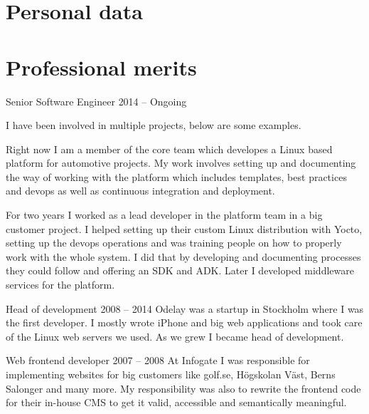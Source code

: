 \documentclass{twocolcv}
\begin{document}
\section*{Personal data}
\section*{Professional merits}
           {Senior Software Engineer}
           {2014 -- Ongoing}
           {
             {I have been involved in multiple projects, below are some examples.\newline}
             
        {Right now I am a member of the core team which developes a Linux based platform for automotive projects. My work involves setting up and documenting the way of working with the platform which includes templates, best practices and devops as well as continuous integration and deployment.\newline}
        
        {For two years I worked as a lead developer in the platform team in a big customer project. I helped setting up their custom Linux distribution with Yocto, setting up the devops operations and was training people on how to properly work with the whole system. I did that by developing and documenting processes they could follow and offering an SDK and ADK. Later I developed middleware services for the platform.}
}

     {Head of development}
     {2008 -- 2014}
     {Odelay was a startup in Stockholm where I was the first developer. I mostly wrote iPhone and big web applications and took care of the Linux web servers we used. As we grew I became head of development.}

     {Web frontend developer}
     {2007 -- 2008}
     {At Infogate I was responsible for implementing websites for big customers like golf.se, Högskolan Väst, Berns Salonger and many more. My responsibility was also to rewrite the frontend code for their in-house CMS to get it valid, accessible and semantically meaningful.}
\end{document}
